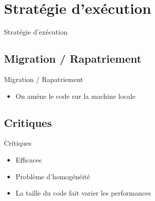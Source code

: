 \def\sectitle{Stratégie d'exécution}
\section{\sectitle}
\begin{frame}{\sectitle}
    \def\subsectitle{Migration / Rapatriement}
    \subsection{\subsectitle}
    \begin{block}{\subsectitle}
        \begin{itemize}
            \item On amène le code sur la machine locale
        \end{itemize}
    \end{block}
    \def\subsectitle{Critiques}
    \subsection{\subsectitle}
    \begin{block}{\subsectitle}
        \begin{itemize}
            \item Efficaces
            \item Problème d'homogénéité
            \item La taille du code fait varier les performances
        \end{itemize}
    \end{block}
\end{frame}

